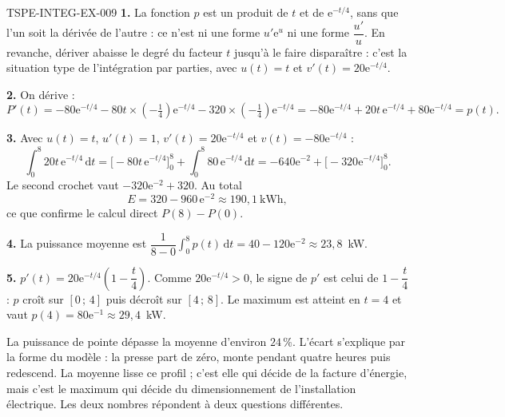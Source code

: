 \begin{corrige}{TSPE-INTEG-EX-009}
\textbf{1.} La fonction $p$ est un produit de $t$ et de
$\mathrm{e}^{-t/4}$, sans que l'un soit la dérivée de l'autre : ce n'est ni une
forme $u'\mathrm{e}^{u}$ ni une forme $\dfrac{u'}{u}$. En revanche, dériver
abaisse le degré du facteur $t$ jusqu'à le faire disparaître : c'est la situation
type de l'intégration par parties, avec $u(t)=t$ et
$v'(t)=20\mathrm{e}^{-t/4}$.

\textbf{2.} On dérive :
\[
  P'(t)=-80\mathrm{e}^{-t/4}-80t\times\left(-\tfrac14\right)\mathrm{e}^{-t/4}
  -320\times\left(-\tfrac14\right)\mathrm{e}^{-t/4}
  =-80\mathrm{e}^{-t/4}+20t\,\mathrm{e}^{-t/4}+80\mathrm{e}^{-t/4}=p(t).
\]

\textbf{3.} Avec $u(t)=t$, $u'(t)=1$, $v'(t)=20\mathrm{e}^{-t/4}$ et
$v(t)=-80\mathrm{e}^{-t/4}$ :
\[
  \int_0^8 20t\,\mathrm{e}^{-t/4}\,\mathrm{d}t
  =\Big[-80t\,\mathrm{e}^{-t/4}\Big]_0^8+\int_0^8 80\,\mathrm{e}^{-t/4}\,\mathrm{d}t
  =-640\mathrm{e}^{-2}+\Big[-320\mathrm{e}^{-t/4}\Big]_0^8.
\]
Le second crochet vaut $-320\mathrm{e}^{-2}+320$. Au total
\[
  E=320-960\,\mathrm{e}^{-2}\approx 190{,}1\ \text{kWh},
\]
ce que confirme le calcul direct $P(8)-P(0)$.

\textbf{4.} La puissance moyenne est
$\dfrac{1}{8-0}\displaystyle\int_0^8 p(t)\,\mathrm{d}t=40-120\mathrm{e}^{-2}\approx 23{,}8$~kW.

\textbf{5.} $p'(t)=20\mathrm{e}^{-t/4}\left(1-\dfrac t4\right)$. Comme
$20\mathrm{e}^{-t/4}>0$, le signe de $p'$ est celui de $1-\dfrac t4$ : $p$ croît
sur $[0\,;\,4]$ puis décroît sur $[4\,;\,8]$. Le maximum est atteint en $t=4$ et
vaut $p(4)=80\mathrm{e}^{-1}\approx 29{,}4$~kW.

La puissance de pointe dépasse la moyenne d'environ $24\,\%$. L'écart s'explique
par la forme du modèle : la presse part de zéro, monte pendant quatre heures puis
redescend. La moyenne lisse ce profil ; c'est elle qui décide de la facture
d'énergie, mais c'est le maximum qui décide du dimensionnement de
l'installation électrique. Les deux nombres répondent à deux questions
différentes.
\end{corrige}
